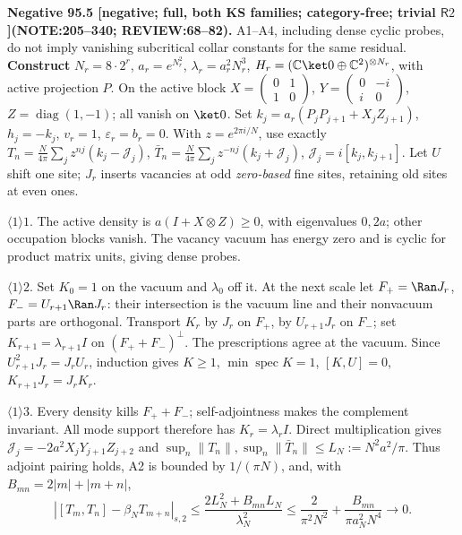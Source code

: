 \textbf{Negative 95.5 [negative; full, both KS families; category-free; trivial \(\mathsf R2\)]\newline (NOTE:205--340; REVIEW:68--82).}
A1--A4, including dense cyclic probes, do not imply vanishing subcritical collar constants for the same residual.
\textbf{Construct} \(N_r=8\cdot2^r\), \(a_r=e^{N_r^2}\), \(\lambda_r=a_r^2N_r^3\),
\(H_r=(\mathbb C\ket0\oplus\mathbb C^2)^{\otimes N_r}\), with active projection \(P\).
On the active block \(X=\left(\begin{smallmatrix}0&1\\1&0\end{smallmatrix}\right)\),
\(Y=\left(\begin{smallmatrix}0&-i\\i&0\end{smallmatrix}\right)\), \(Z=\operatorname{diag}(1,-1)\); all vanish on \(\ket0\).
Set \(k_j=a_r(P_jP_{j+1}+X_jZ_{j+1})\), \(h_j=-k_j\), \(v_r=1\), \(\varepsilon_r=b_r=0\).
With \(z=e^{2\pi i/N}\), use exactly
\(T_n=\frac N{4\pi}\sum_jz^{nj}(k_j-\mathcal J_j)\),
\(\bar T_n=\frac N{4\pi}\sum_jz^{-nj}(k_j+\mathcal J_j)\), \(\mathcal J_j=i[k_j,k_{j+1}]\).
Let \(U\) shift one site; \(J_r\) inserts vacancies at odd \emph{zero-based} fine sites, retaining old sites at even ones.
\par\(\langle1\rangle1\). The active density is \(a(I+X\otimes Z)\ge0\), with eigenvalues \(0,2a\); other occupation
blocks vanish. The vacancy vacuum has energy zero and is cyclic for product matrix units, giving dense probes.
\par\(\langle1\rangle2\). Set \(K_0=1\) on the vacuum and \(\lambda_0\) off it. At the next scale let
\(F_+=\Ran J_r\), \(F_-=U_{r+1}\Ran J_r\): their intersection is the vacuum line and their nonvacuum parts are orthogonal.
Transport \(K_r\) by \(J_r\) on \(F_+\), by \(U_{r+1}J_r\) on \(F_-\); set \(K_{r+1}=\lambda_{r+1}I\) on
\((F_++F_-)^\perp\). The prescriptions agree at the vacuum. Since \(U_{r+1}^2J_r=J_rU_r\), induction gives
\(K\ge1\), \(\min\operatorname{spec}K=1\), \([K,U]=0\), \(K_{r+1}J_r=J_rK_r\).
\par\(\langle1\rangle3\). Every density kills \(F_++F_-\); self-adjointness makes the complement invariant.
All mode support therefore has \(K_r=\lambda_r I\). Direct multiplication gives
\(\mathcal J_j=-2a^2X_jY_{j+1}Z_{j+2}\) and \(\sup_n\|T_n\|,\sup_n\|\bar T_n\|\le L_N:=N^2a^2/\pi\).
Thus adjoint pairing holds, A2 is bounded by \(1/(\pi N)\), and, with \(B_{mn}=2|m|+|m+n|\),
\[
 |[T_m,T_n]-\beta_NT_{m+n}|_{s,2}
 \le\frac{2L_N^2+B_{mn}L_N}{\lambda_N^2}
 \le\frac2{\pi^2N^2}+\frac{B_{mn}}{\pi a_N^2N^4}\longrightarrow0.
\]

